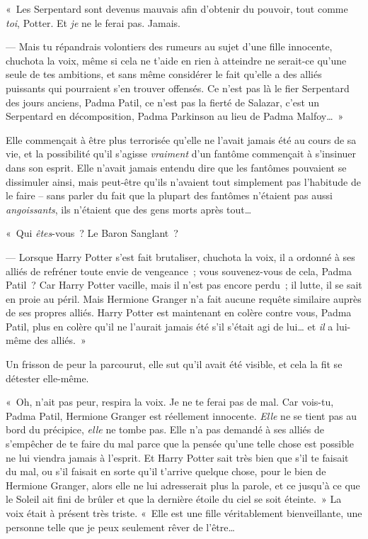 «~Les Serpentard sont devenus mauvais afin d'obtenir du pouvoir, tout comme \emph{toi}, Potter.
Et \emph{je} ne le ferai pas.
Jamais.

--- Mais tu répandrais volontiers des rumeurs au sujet d'une fille innocente, chuchota la voix, même si cela ne t'aide en rien à atteindre ne serait-ce qu'une seule de tes ambitions, et sans même considérer le fait qu'elle a des alliés puissants qui pourraient s'en trouver offensés.
Ce n'est pas là le fier Serpentard des jours anciens, Padma Patil, ce n'est pas la fierté de Salazar, c'est un Serpentard en décomposition, Padma Parkinson au lieu de Padma Malfoy…~»

Elle commençait à être plus terrorisée qu'elle ne l'avait jamais été au cours de sa vie, et la possibilité qu'il s'agisse \emph{vraiment} d'un fantôme commençait à s'insinuer dans son esprit.
Elle n'avait jamais entendu dire que les fantômes pouvaient se dissimuler ainsi, mais peut-être qu'ils n'avaient tout simplement pas l'habitude de le faire -- sans parler du fait que la plupart des fantômes n'étaient pas aussi \emph{angoissants}, ils n'étaient que des gens morts après tout…

«~Qui \emph{êtes}-vous~?
Le Baron Sanglant~?

--- Lorsque Harry Potter s'est fait brutaliser, chuchota la voix, il a ordonné à ses alliés de refréner toute envie de vengeance~; vous souvenez-vous de cela, Padma Patil~?
Car Harry Potter vacille, mais il n'est pas encore perdu~; il lutte, il se sait en proie au péril.
Mais Hermione Granger n'a fait aucune requête similaire auprès de ses propres alliés.
Harry Potter est maintenant en colère contre vous, Padma Patil, plus en colère qu'il ne l'aurait jamais été s'il s'était agi de lui… et \emph{il} a lui-même des alliés.~»

Un frisson de peur la parcourut, elle sut qu'il avait été visible, et cela la fit se détester elle-même.

«~Oh, n'ait pas peur, respira la voix.
Je ne te ferai pas de mal.
Car vois-tu, Padma Patil, Hermione Granger est réellement innocente.
\emph{Elle} ne se tient pas au bord du précipice, \emph{elle} ne tombe pas.
Elle n'a pas demandé à ses alliés de s'empêcher de te faire du mal parce que la pensée qu'une telle chose est possible ne lui viendra jamais à l'esprit.
Et Harry Potter sait très bien que s'il te faisait du mal, ou s'il faisait en sorte qu'il t'arrive quelque chose, pour le bien de Hermione Granger, alors elle ne lui adresserait plus la parole, et ce jusqu'à ce que le Soleil ait fini de brûler et que la dernière étoile du ciel se soit éteinte.~»
La voix était à présent très triste.
«~Elle est une fille véritablement bienveillante, une personne telle que je peux seulement rêver de l'être…

